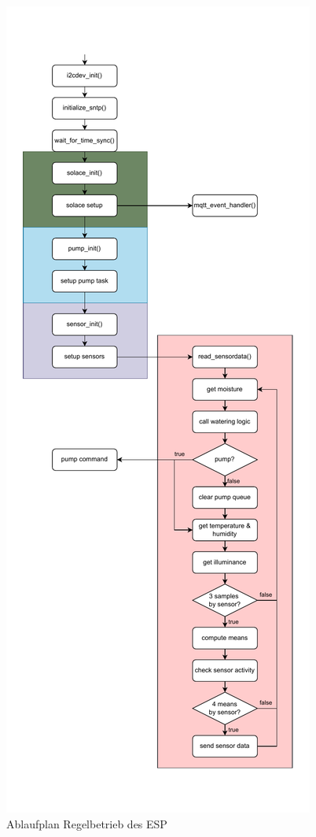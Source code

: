 \begin{figure}[H]
	\centering
	\vspace{0pt} %
	\includegraphics[height=0.97\textheight, keepaspectratio]{./img/esp_regelbetrieb.pdf}
	\caption{Ablaufplan Regelbetrieb des ESP}
	\label{fig:esp_regelbetrieb}
\end{figure}
\newpage

